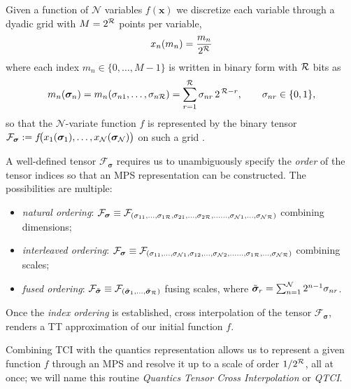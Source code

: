 Given a function of $\mathcal{N}$ variables $f(\boldsymbol{x})$ we discretize each variable through a dyadic grid with \(M=2^{\mathcal{R}}\) points per variable, 
\begin{equation}
	x_n(m_n) =\frac{m_n}{2^{\mathcal{R}}}
	\label{eq:quanticsGrid}
\end{equation}
where each index \(m_n\in\{0,\dots,M-1\}\) is written in binary form with $\mathcal{R}$ bits as 
\begin{equation}
	m_n(\boldsymbol{\sigma}_n)  = m_n(\sigma_{n1},\dots,\sigma_{n\mathcal{R}})=\sum_{r=1}^{\mathcal{R}}\sigma_{nr}\,2^{\,\mathcal{R}-r},\quad 
\quad \sigma_{nr}\in\{0,1\},
\label{eq:quanticsRepr}
\end{equation}
so that the \(\mathcal{N}\)-variate function \(f\) is represented by the binary tensor \(\mathcal{F}_{\boldsymbol{\sigma}}:=f\!\bigl(x_1(\boldsymbol{\sigma}_1),\dots,x_{\mathcal{N}}(\boldsymbol{\sigma}_{\mathcal{N}})\bigr)\) on such a grid \cite{Khoromskij2011, Hiroshi2023}.

A well-defined tensor \(\mathcal{F}_{\boldsymbol{\sigma}}\) requires us to unambiguously specify the \textit{order} of the tensor indices so that an MPS representation can be constructed. The possibilities are multiple:
\begin{itemize}
	\item \textit{natural ordering}: $\mathcal{F}_{\boldsymbol{\sigma}} \equiv \mathcal{F}_{(\sigma_{11},\dots,\sigma_{1\mathcal{R}},\sigma_{21},\dots,\sigma_{2\mathcal{R}}, \dots\dots,\sigma_{\mathcal{N}1},\dots,\sigma_{\mathcal{N}\mathcal{R}})}$ combining dimensions;
	\item \textit{interleaved ordering}: $\mathcal{F}_{\boldsymbol{\sigma}} \equiv \mathcal{F}_{(\sigma_{11},\dots,\sigma_{\mathcal{N}1},\sigma_{12},\dots,\sigma_{\mathcal{N}2}, \dots\dots,\sigma_{1\mathcal{R}},\dots,\sigma_{\mathcal{N}\mathcal{R}})}$ combining scales;
	\item \textit{fused ordering}: $\mathcal{F}_{\tilde {\boldsymbol{\sigma}}} \equiv \mathcal{F}_{({\tilde {\boldsymbol{\sigma}}}_{1},\dots,{\tilde {\boldsymbol{\sigma}}}_{\mathcal{R}})}$ fusing scales, where ${\tilde {\boldsymbol{\sigma}}}_r = \sum_{n=1}^{\mathcal{N}} 2^{n-1}\sigma_{nr}$.
\end{itemize} 
Once the \textit{index ordering} is established, cross interpolation of the tensor \(\mathcal{F}_{\boldsymbol{\sigma}}\), renders a TT approximation of our initial function $f$. 

Combining TCI with the quantics representation allows us to represent a given function $f$ through an MPS and resolve it up to a scale of order $1/2^{\mathcal{R}}$, all at once; we will name this routine \textit{Quantics Tensor Cross Interpolation} or \textit{QTCI}. 

